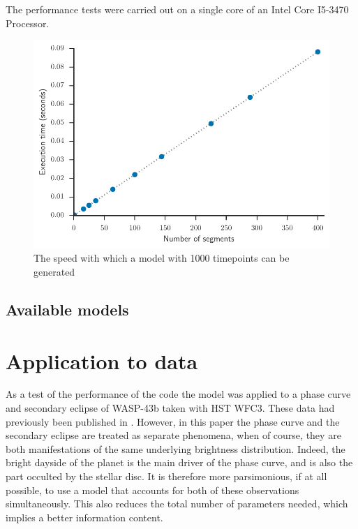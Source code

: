 \documentclass[a4paper,fleqn,usenatbib]{mnras}
\begin{document}
The performance tests were carried out on a single core of an Intel Core I5-3470 Processor.

\begin{figure}
\begin{center}
\includegraphics[width=\columnwidth]{img/exec_time.pdf}
\caption{The speed with which a model with 1000 timepoints can be generated}
\label{fig:exec_time}
\end{center}
\end{figure}

\subsection{Available models}\label{sec:ttof}


\section{Application to data}\label{sec:Application}

As a test of the performance of the code the model was applied to a phase curve and secondary eclipse of WASP-43b taken with HST WFC3. These data had previously been published in \citet{Stevenson2014}. However, in this paper the phase curve and the secondary eclipse are treated as separate phenomena, when of course, they are both manifestations of the same underlying brightness distribution. Indeed, the bright dayside of the planet is the main driver of the phase curve, and is also the part occulted by the stellar disc. It is therefore more parsimonious, if at all possible, to use a model that accounts for both of these observations simultaneously. This also reduces the total number of parameters needed, which implies a better information content.
\end{document}

